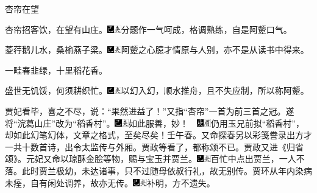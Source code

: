 杏帘在望

杏帘招客饮，在望有山庄。{\includegraphics[width=3mm]{../Images/00003}\includegraphics[width=3mm]{../Images/00012}\footnotesize \kaishu 分题作一气呵成，格调熟练，自是阿颦口气。}

菱荇鹅儿水，桑榆燕子梁。{\includegraphics[width=3mm]{../Images/00003}\includegraphics[width=3mm]{../Images/00012}\footnotesize \kaishu 阿颦之心臆才情原与人别，亦不是从读书中得来。}

一畦春韭绿，十里稻花香。

盛世无饥馁，何须耕织忙。{\includegraphics[width=3mm]{../Images/00003}\includegraphics[width=3mm]{../Images/00012}\footnotesize \kaishu 以幻入幻，顺水推舟，且不失应制，所以称阿颦。}

贾妃看毕，喜之不尽，说：``果然进益了！''又指``杏帘''一首为前三首之冠。遂将``浣葛山庄''改为``稻香村''。{\includegraphics[width=3mm]{../Images/00003}\includegraphics[width=3mm]{../Images/00012}\footnotesize \kaishu 如此服善，妙！　{\includegraphics[width=3mm]{../Images/00004}\includegraphics[width=3mm]{../Images/00010}\footnotesize \kaishu 仍用玉兄前拟``稻香村''，却如此幻笔幻体，文章之格式，至矣尽矣！壬午春。}}又命探春另以彩笺誊录出方才一共十数首诗，出令太监传与外厢。贾政等看了，都称颂不已。贾政又进《归省颂》。元妃又命以琼酥金脍等物，赐与宝玉并贾兰。{\includegraphics[width=3mm]{../Images/00003}\includegraphics[width=3mm]{../Images/00012}\footnotesize \kaishu 百忙中点出贾兰，一人不落。}此时贾兰极幼，未达诸事，只不过随母依叔行礼，故无别传。贾环从年内染病未痊，自有闲处调养，故亦无传。{\includegraphics[width=3mm]{../Images/00003}\includegraphics[width=3mm]{../Images/00012}\footnotesize \kaishu 补明，方不遗失。}

